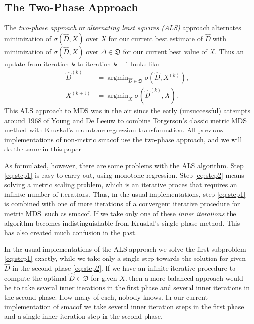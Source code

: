 \documentclass[
  12pt,
]{article}
\begin{document}
\subsection{The Two-Phase Approach}\label{the-two-phase-approach}

The \emph{two-phase approach} or \emph{alternating least squares (ALS)} approach
alternates minimization of \(\sigma(\hat D,X)\) over \(X\) for our current
best estimate of \(\hat D\) with minimization of \(\sigma(\hat D,X)\) over
\(\Delta\in\mathfrak{D}\) for our current best value of \(X\). Thus an
update from iteration \(k\) to iteration \(k+1\) looks like
\begin{align}
\hat D^{(k)}&=\mathop{\text{argmin}}_{\hat D\in\mathfrak{D}}\sigma(\hat D,X^{(k)}),\label{eq:step1}\\
X^{(k+1)}&=\mathop{\text{argmin}}_X\sigma(\hat D^{(k)},X).\label{eq:step2}
\end{align}
This ALS approach to MDS was in the air since the early
(unsuccessful) attempts around 1968 of Young and De Leeuw to combine
Torgerson's classic metric MDS method with Kruskal's monotone regression
transformation. All previous implementations of non-metric smacof
use the two-phase approach, and we will do the same in this paper.

As formulated, however, there are some problems with the ALS algorithm.
Step \eqref{eq:step1} is easy to carry out, using monotone regression.
Step \eqref{eq:step2} means solving a metric scaling problem, which is an
iterative proces that requires an infinite number of iterations. Thus,
in the usual implementations, step \eqref{eq:step1} is combined with one
of more iterations of a convergent iterative procedure for metric MDS,
such as smacof. If we take only one of these \emph{inner iterations} the
algorithm becomes indistinguishable from Kruskal's single-phase method.
This has also created much confusion in the past.

In the usual implementations of the ALS approach we solve the first
subproblem \eqref{eq:step1} exactly, while we take only a single step
towards the solution for given \(\hat D\) in the second phase
\eqref{eq:step2}. If we have an infinite iterative procedure to compute
the optimal \(\hat D\in\mathfrak{D}\) for given \(X\), then a more balanced
approach would be to take several inner iterations in the first phase and
several inner iterations in the second phase. How many of each, nobody
knows. In our current implementation of smacof we take several inner
iteration steps in the first phase and a single inner iteration step
in the second phase.
\end{document}
